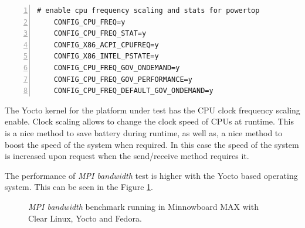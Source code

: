\begin{minipage}{\textwidth}
\begin{lstlisting}[frame=single,numbers=left]
    # enable cpu frequency scaling and stats for powertop
    CONFIG_CPU_FREQ=y
    CONFIG_CPU_FREQ_STAT=y
    CONFIG_X86_ACPI_CPUFREQ=y
    CONFIG_X86_INTEL_PSTATE=y
    CONFIG_CPU_FREQ_GOV_ONDEMAND=y
    CONFIG_CPU_FREQ_GOV_PERFORMANCE=y
    CONFIG_CPU_FREQ_DEFAULT_GOV_ONDEMAND=y
\end{lstlisting}
\label{kernel_yocto} 
\end{minipage}

\begin{minipage}{\textwidth}
\end{minipage}

The Yocto kernel for the platform under test has the CPU clock frequency
scaling enable. Clock scaling allows to change the clock speed of CPUs at
runtime. This is a nice method to save battery during runtime, as well as, a
nice method to boost the speed of the system when required. In this case the
speed of the system is increased upon request when the send/receive method
requires it.


The performance of \textit{MPI bandwidth} test is higher with the Yocto based
operating system. This can be seen in the Figure \ref{mpi_bandwidth_yocto}.

\begin{figure}[H]
\begin{center}
\end{center}
\caption{\textit{MPI bandwidth} benchmark running in Minnowboard MAX with Clear Linux,
Yocto and Fedora.}
\label{mpi_bandwidth_yocto}
\end{figure}


